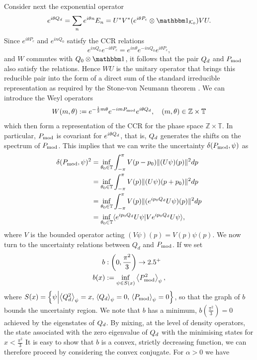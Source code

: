Consider next the exponential operator $$e^{i\theta \Qd}= \sum_n e^{i\theta n} E_n = U^*V^*(e^{i\theta P_c}\otimes \id_{\mathcal K_0})VU.$$
Since $e^{i\theta P_c}$ and $e^{in Q_0}$ satisfy the CCR relations
$$
e^{in Q_0}e^{-i\theta P_c} = e^{in\theta} e^{-in Q_0}e^{i\theta P_c},
$$
and $W$ commutes with $Q_0\otimes \id$, it follows that the pair $Q_d$ and $P_{\mathrm{mod}}$ also satisfy the relations. Hence $WU$ is the unitary operator that brings this reducible pair into the form of a direct sum of the standard irreducible representation as required by the Stone-von Neumann theorem \cites{10.2307/1968535}{hall-quantum-theory}. We can introduce the Weyl operators 
$$
W(m,\theta) := e^{-\frac 12 m\theta} e^{-im P_{\mathrm{mod}}}e^{i\theta Q_d}, \quad (m,\theta) \in \mathbb Z\times \mathbb T
$$
which then form a representation of the CCR for the phase space $\mathbb Z\times \mathbb T$. In particular, $P_{\mathrm{mod}}$ is covariant for $e^{i\theta Q_d}$, that is, $Q_d$ generates the shifts on the spectrum of $P_{\mathrm{mod}}$. This implies that we can write the uncertainty $\delta(P_{\mathrm{mod}},\psi)$ as
\begin{align*}
\delta(P_{\mathrm{mod}},\psi)^2 &= \inf_{\theta_0\in \mathbb T} \int_{-\pi}^\pi V(p-p_0) \|(U\psi)(p)\|^2 dp\\
&= \inf_{\theta_0\in \mathbb T} \int_{-\pi}^\pi V(p) \|(U\psi)(p+p_0)\|^2 dp\\
&= \inf_{\theta_0\in \mathbb T} \int_{-\pi}^\pi V(p) \|(e^{ip_0Q_d}U\psi)(p)\|^2 dp\\
&= \inf_{\theta_0\in \mathbb T} \langle e^{ip_0Q_d}U\psi| V e^{ip_0Q_d}U\psi\rangle,
\end{align*}
where $V$ is the bounded operator acting $(V\psi)(p) = V(p)\psi(p)$. We now turn to the uncertainty relations between $Q_d$ and $P_{\mathrm{mod}}$. If we set
\begin{align*}
  b&:\left(0,\frac{\pi^2}{3}\right)\to 2.5^+\\
  b(x) &:= \inf_{\psi\in S(x)} \left\langle{P_{\mathrm{mod}}^2}\right\rangle_{\psi},
\end{align*}
where $S(x) = \left\{\psi\middle| \left\langle{Q_d^2}\right\rangle_{\psi} = x,\,\left\langle{Q_d}\right\rangle_{\psi} = 0,\,\left\langle{P_{\mathrm{mod}}}\right\rangle_{\psi} = 0 \right\}$, so that the graph of $b$ bounds the uncertainty region. We note that $b$ has a minimum, $b\left(\frac{\pi^2}{3}\right) = 0$ achieved by the eigenstates of $Q_d$. By mixing, at the level of density operators, the state associated with the zero eigenvalue of $Q_d$ with the minimising states for $x < \frac{\pi^2}{3}$ It is easy to show that $b$ is a convex, strictly decreasing function, we can therefore proceed by considering the convex conjugate. For $\alpha > 0$ we have
